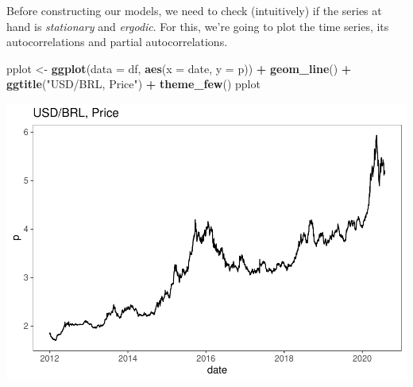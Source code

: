 \documentclass[11pt, a4paper]{report}
\newenvironment{Shaded}{\begin{snugshade}}{\end{snugshade}}
\newcommand{\DataTypeTok}[1]{\textcolor[rgb]{0.13,0.29,0.53}{#1}}
\newcommand{\KeywordTok}[1]{\textcolor[rgb]{0.13,0.29,0.53}{\textbf{#1}}}
\newcommand{\NormalTok}[1]{#1}
\newcommand{\OperatorTok}[1]{\textcolor[rgb]{0.81,0.36,0.00}{\textbf{#1}}}
\newcommand{\StringTok}[1]{\textcolor[rgb]{0.31,0.60,0.02}{#1}}
\theoremstyle{plain}
\theoremstyle{plain}
\theoremstyle{remark}
\begin{document}
Before constructing our models, we need to check (intuitively) if the
series at hand is \emph{stationary} and \emph{ergodic}. For this, we're
going to plot the time series, its autocorrelations and partial
autocorrelations.

\begin{Shaded}
\begin{Highlighting}[]
\NormalTok{pplot <-}\StringTok{ }\KeywordTok{ggplot}\NormalTok{(}\DataTypeTok{data =}\NormalTok{ df, }\KeywordTok{aes}\NormalTok{(}\DataTypeTok{x =}\NormalTok{ date, }\DataTypeTok{y =}\NormalTok{ p)) }\OperatorTok{+}\StringTok{ }\KeywordTok{geom_line}\NormalTok{() }\OperatorTok{+}\StringTok{ }
\StringTok{    }\KeywordTok{ggtitle}\NormalTok{(}\StringTok{"USD/BRL, Price"}\NormalTok{) }\OperatorTok{+}\StringTok{ }\KeywordTok{theme_few}\NormalTok{()}
\NormalTok{pplot}
\end{Highlighting}
\end{Shaded}

\begin{center}\includegraphics{Econo2_P1_files/figure-latex/plots-1} \end{center}

\begin{Shaded}
\end{Shaded}
\end{document}
